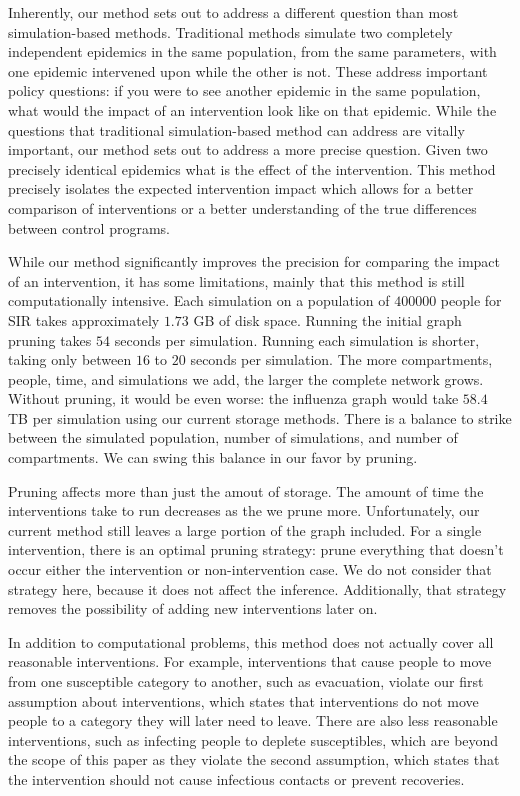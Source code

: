 \documentclass[openacc]{rsproca_new}%
\begin{document}
Inherently, our method sets out to address a different question than most simulation-based methods.
Traditional methods simulate two completely independent epidemics in the same population, from the same parameters, with one epidemic intervened upon while the other is not. %
These address important policy questions: if you were to see another epidemic in the same population, what would the impact of an intervention look like on that epidemic.
While the questions that traditional simulation-based method can address are vitally important, our method sets out to address a more precise question.
Given two precisely identical epidemics what is the effect of the intervention. This method precisely isolates the expected intervention impact which allows for a better comparison of interventions or a better understanding of the true differences between control programs. 

While our method significantly improves the precision for comparing the impact of an intervention, it has some limitations, mainly that this method is still computationally intensive.
Each simulation on a population of $400000$ people for SIR takes approximately $1.73$ GB of disk space.
Running the initial graph pruning takes $54$ seconds per simulation.
Running each simulation is shorter, taking only between $16$ to $20$ seconds per simulation.
The more compartments, people, time, and simulations we add, the larger the complete network grows.
Without pruning, it would be even worse: the influenza graph would take $58.4$ TB per simulation using our current storage methods.
There is a balance to strike between the simulated population, number of simulations, and number of compartments.
We can swing this balance in our favor by pruning.

Pruning affects more than just the amout of storage.
The amount of time the interventions take to run decreases as the we prune more.
Unfortunately, our current method still leaves a large portion of the graph included.
For a single intervention, there is an optimal pruning strategy: prune everything that doesn't occur either the intervention or non-intervention case.
We do not consider that strategy here, because it does not affect the inference.
Additionally, that strategy removes the possibility of adding new interventions later on.

In addition to computational problems, this method does not actually cover all reasonable interventions.
For example, interventions that cause people to move from one susceptible category to another, such as evacuation, violate our first assumption about interventions, which states that interventions do not move people to a category they will later need to leave.
There are also less reasonable interventions, such as infecting people to deplete susceptibles, which are beyond the scope of this paper as they violate the second assumption, which states that the intervention should not cause infectious contacts or prevent recoveries.
\end{document}
